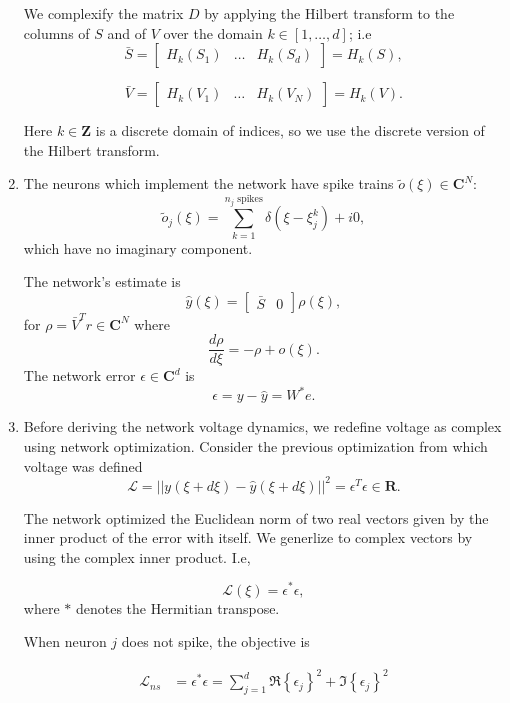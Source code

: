\begin{enumerate}
We complexify the matrix $D$ by applying the Hilbert transform to the columns of $S$ and of $V$ over the domain $k \in \left[ 1,\hdots,d\right]$;  i.e
$$
\bar{S} = 
\begin{bmatrix}
H_k(S_1) & \hdots & H_k(S_d)
\end{bmatrix}  
= H_k(S),
$$

$$
\bar{V} = 
\begin{bmatrix}
H_k(V_1) & \hdots & H_k(V_N)
\end{bmatrix}  
= H_k(V).
$$

Here $k \in \mathbf{Z}$ is a discrete domain of indices, so we use the discrete version of the Hilbert transform.


\item The neurons which implement the network have spike trains $\tilde{o}(\xi) \in \mathbf{C}^{N}$:
    \begin{equation*}
        \tilde{o}_j(\xi) = \sum_{k=1}^{\text{$n_j$ spikes}} \delta(\xi - \xi_{j}^{k}) + i0,
    \end{equation*}
	which have no imaginary component. 
	
    The network's estimate is
	$$
      \hat{y}(\xi) = \begin{bmatrix}
      \bar{S} & 0
      \end{bmatrix} \rho(\xi), 
	$$
    for $\rho = \bar{V}^T r \in \mathbf{C}^N$ where
	$$
        \frac{d\rho}{d \xi} = -\rho + o(\xi).
    $$
	The network error $\epsilon \in \mathbf{C}^d$ is 
	$$
		\epsilon = y - \hat{y}  = W^* e.
	$$


\item Before deriving the network voltage dynamics, we redefine voltage as complex using network optimization. Consider the previous optimization from which voltage was defined
$$
\mathcal{L} = || y(\xi + d\xi) - \hat{y}(\xi + d\xi)||^2 = \epsilon^T \epsilon \in \mathbf{R}.$$

The network optimized the Euclidean norm of two real vectors given by the inner product of the error with itself. We generlize to complex vectors by using the complex inner product. I.e, 

$$
\mathcal{L}(\xi) = \epsilon^*\epsilon, 
$$
where $*$ denotes the Hermitian transpose.

When neuron $j$ does not spike, the objective is

\begin{align*}
\mathcal{L}_{ns} 
&= \epsilon^*\epsilon = \sum_{j=1}^d \Re\left\{\epsilon_j\right\}^2 + \Im\left\{\epsilon_j\right\}^2
\end{align*}



\end{enumerate}
